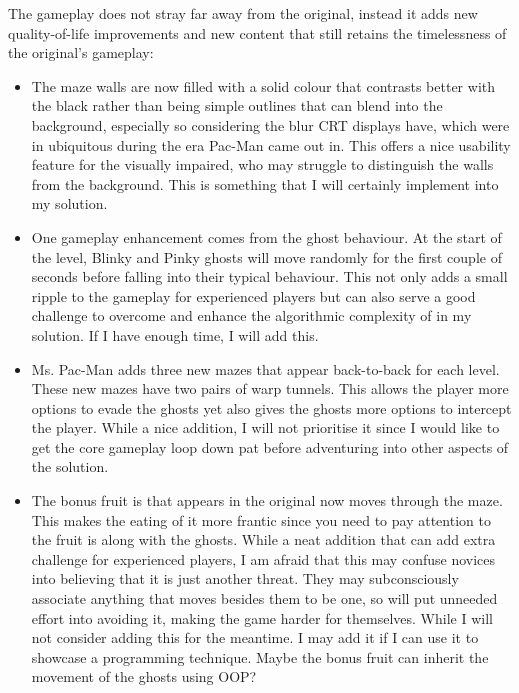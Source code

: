 \documentclass[letterpaper, 11pt]{article}
\begin{document}
The gameplay does not stray far away from the original, instead it adds new quality-of-life improvements and new content that still retains the timelessness of the original’s gameplay:

\begin{itemize}
\item The maze walls are now filled with a solid colour that contrasts better with the black rather than being simple outlines that can blend into the background, especially so considering the blur CRT displays have, which were in ubiquitous during the era Pac-Man came out in.
This offers a nice usability feature for the visually impaired, who may struggle to distinguish the walls from the background.
This is something that I will certainly implement into my solution.
\item One gameplay enhancement comes from the ghost behaviour.
At the start of the level, Blinky and Pinky ghosts will move randomly for the first couple of seconds before falling into their typical behaviour.
This not only adds a small ripple to the gameplay for experienced players but can also serve a good challenge to overcome and enhance the algorithmic complexity of in my solution.
If I have enough time, I will add this.

\item Ms. Pac-Man adds three new mazes that appear back-to-back for each level.
These new mazes have two pairs of warp tunnels.
This allows the player more options to evade the ghosts yet also gives the ghosts more options to intercept the player.
While a nice addition, I will not prioritise it since I would like to get the core gameplay loop down pat before adventuring into other aspects of the solution.

\item The bonus fruit is that appears in the original now moves through the maze.
This makes the eating of it more frantic since you need to pay attention to the fruit is along with the ghosts.
While a neat addition that can add extra challenge for experienced players, I am afraid that this may confuse novices into believing that it is just another threat.
They may subconsciously associate anything that moves besides them to be one, so will put unneeded effort into avoiding it, making the game harder for themselves.
While I will not consider adding this for the meantime. I may add it if I can use it to showcase a programming technique. Maybe the bonus fruit can inherit the movement of the ghosts using OOP?
\end{itemize}

\printbibliography
\end{document}
